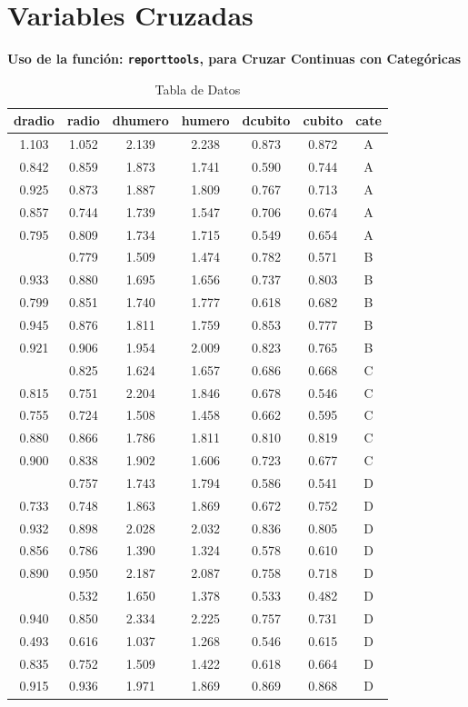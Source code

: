 \documentclass[12pt,a4paper,]{book}
\numberwithin{dummy}{section}
\theoremstyle{ocrenumbox}
\theoremstyle{ocrenumbox}
\theoremstyle{ocrenumbox}
\theoremstyle{ocrenumbox}
\theoremstyle{ocrenum}
\begin{document}
\hypertarget{variables-cruzadas}{%
\section{Variables Cruzadas}\label{variables-cruzadas}}

\textbf{Uso de la función: \texttt{reporttools}, para Cruzar Continuas
con Categóricas}

\begingroup\fontsize{8}{10}\selectfont

\begin{longtable}[t]{ccccccc}
\caption{\label{tab:unnamed-chunk-13}Tabla de Datos}\\
\toprule
dradio & radio & dhumero & humero & dcubito & cubito & cate\\
\midrule
1.103 & 1.052 & 2.139 & 2.238 & 0.873 & 0.872 & A\\
0.842 & 0.859 & 1.873 & 1.741 & 0.590 & 0.744 & A\\
0.925 & 0.873 & 1.887 & 1.809 & 0.767 & 0.713 & A\\
0.857 & 0.744 & 1.739 & 1.547 & 0.706 & 0.674 & A\\
0.795 & 0.809 & 1.734 & 1.715 & 0.549 & 0.654 & A\\
\addlinespace
0.787 & 0.779 & 1.509 & 1.474 & 0.782 & 0.571 & B\\
0.933 & 0.880 & 1.695 & 1.656 & 0.737 & 0.803 & B\\
0.799 & 0.851 & 1.740 & 1.777 & 0.618 & 0.682 & B\\
0.945 & 0.876 & 1.811 & 1.759 & 0.853 & 0.777 & B\\
0.921 & 0.906 & 1.954 & 2.009 & 0.823 & 0.765 & B\\
\addlinespace
0.792 & 0.825 & 1.624 & 1.657 & 0.686 & 0.668 & C\\
0.815 & 0.751 & 2.204 & 1.846 & 0.678 & 0.546 & C\\
0.755 & 0.724 & 1.508 & 1.458 & 0.662 & 0.595 & C\\
0.880 & 0.866 & 1.786 & 1.811 & 0.810 & 0.819 & C\\
0.900 & 0.838 & 1.902 & 1.606 & 0.723 & 0.677 & C\\
\addlinespace
0.764 & 0.757 & 1.743 & 1.794 & 0.586 & 0.541 & D\\
0.733 & 0.748 & 1.863 & 1.869 & 0.672 & 0.752 & D\\
0.932 & 0.898 & 2.028 & 2.032 & 0.836 & 0.805 & D\\
0.856 & 0.786 & 1.390 & 1.324 & 0.578 & 0.610 & D\\
0.890 & 0.950 & 2.187 & 2.087 & 0.758 & 0.718 & D\\
\addlinespace
0.688 & 0.532 & 1.650 & 1.378 & 0.533 & 0.482 & D\\
0.940 & 0.850 & 2.334 & 2.225 & 0.757 & 0.731 & D\\
0.493 & 0.616 & 1.037 & 1.268 & 0.546 & 0.615 & D\\
0.835 & 0.752 & 1.509 & 1.422 & 0.618 & 0.664 & D\\
0.915 & 0.936 & 1.971 & 1.869 & 0.869 & 0.868 & D\\
\bottomrule
\end{longtable}
\endgroup{}
\end{document}

